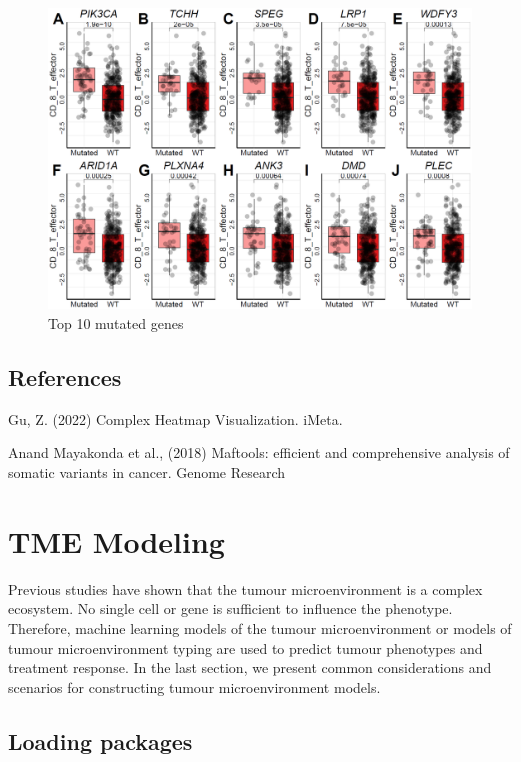 \documentclass[
  12pt,
]{book}
\begin{document}
\begin{figure}

{\centering \includegraphics[width=0.95\linewidth]{./fig/4-Relevant_mutations_binary} 

}

\caption{Top 10 mutated genes}\label{fig:unnamed-chunk-5}
\end{figure}

\hypertarget{references-5}{%
\section{References}\label{references-5}}

Gu, Z. (2022) Complex Heatmap Visualization. iMeta.

Anand Mayakonda et al., (2018) Maftools: efficient and comprehensive analysis of somatic variants in cancer. Genome Research

\hypertarget{tme-modeling}{%
\chapter{\texorpdfstring{\textbf{TME Modeling}}{TME Modeling}}\label{tme-modeling}}

Previous studies have shown that the tumour microenvironment is a complex ecosystem. No single cell or gene is sufficient to influence the phenotype. Therefore, machine learning models of the tumour microenvironment or models of tumour microenvironment typing are used to predict tumour phenotypes and treatment response. In the last section, we present common considerations and scenarios for constructing tumour microenvironment models.

\hypertarget{loading-packages-7}{%
\section{Loading packages}\label{loading-packages-7}}
\end{document}
